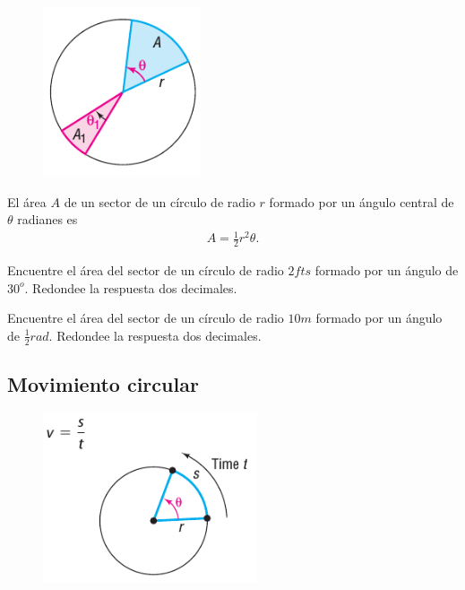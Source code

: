 {}
	\begin{figure}
		\centering
		\includegraphics[height=5cm,keepaspectratio=true]{./trig/sull6115.png}
		\label{fig:sull6115}
	\end{figure}

{}
	\begin{teorema}
		El área $A$ de un sector de un círculo de radio $r$ formado por un ángulo central de $\theta$ radianes es 
		\begin{align}
			\label{sull6108}
			A=\frac{1}{2}r^{2}\theta.
		\end{align}
	\end{teorema}
	

{}
	\begin{problema}
		\label{exmp:sull6107}
		Encuentre el área del sector de un círculo de radio $2fts$ formado por un ángulo de $30^{o}$. Redondee la respuesta dos decimales.  
	\end{problema}
	

{}
	\begin{problema}
		Encuentre el área del sector de un círculo de radio $10m$ formado por un ángulo de $\frac{1}{2}rad$. Redondee la respuesta dos decimales.  
	\end{problema}
	

\subsection{Movimiento circular}
{}
	\begin{figure}
		\centering
		\includegraphics[height=5cm,keepaspectratio=true]{./trig/sull6116.png}
		\label{fig:sull6116}
	\end{figure}
	

